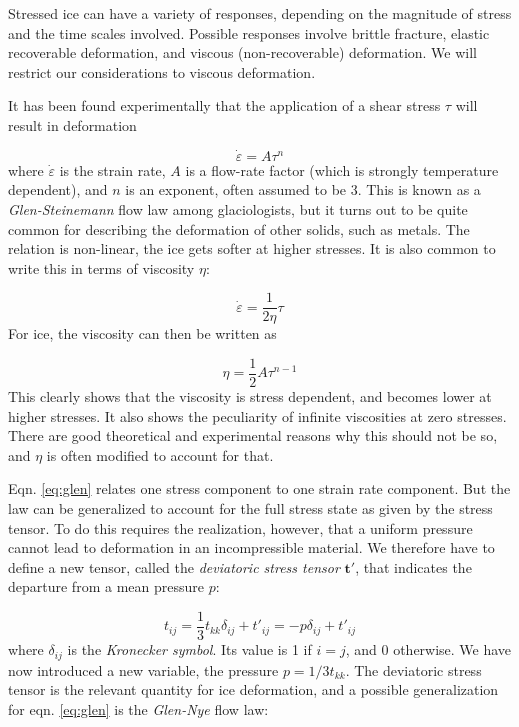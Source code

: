 \documentclass[12pt, openany]{memoir}
\newcommand{\eps}{\dot{\varepsilon}}
\begin{document}
Stressed ice can have a variety of responses, depending on the
magnitude of stress and the time scales involved. Possible responses
involve brittle fracture, elastic recoverable deformation, and viscous
(non-recoverable) deformation. We will restrict our considerations to
viscous deformation.

It has been found experimentally that the application of a shear
stress $\tau$ will result in deformation

\begin{equation} \label{eq:glen}
\eps = A\tau^n
\end{equation}
where $\eps$ is the strain rate, $A$ is a flow-rate factor (which is
strongly temperature dependent), and $n$ is an exponent, often assumed
to be 3. This is known as a \emph{Glen-Steinemann} flow law among
glaciologists, but it turns out to be quite common for describing the
deformation of other solids, such as metals. The relation is non-linear, the ice gets
softer at higher stresses. It is also common to write this in terms of
viscosity $\eta$:

\begin{equation}
\eps = \frac{1}{2\eta}\tau
\end{equation}
For ice, the viscosity can then be written as

\begin{equation}
\eta = \frac{1}{2} A \tau^{n-1}
\end{equation}
This clearly shows that the viscosity is stress dependent, and becomes
lower at higher stresses. It also shows the peculiarity of infinite
viscosities at zero stresses. There are good theoretical and
experimental reasons why this should not be so, and $\eta$ is often
modified to account for that.

Eqn. \ref{eq:glen} relates one stress component to one strain rate
component. But the law can be generalized to account for the full
stress state as given by the stress tensor. To do this requires the
realization, however, that a uniform pressure cannot lead to
deformation in an incompressible material. We therefore have to define
a new tensor, called the \emph{deviatoric stress tensor}
$\mathbf{t}'$, that indicates the departure from a mean pressure $p$:

\begin{equation}
t_{ij} = \frac{1}{3} t_{kk}\delta_{ij} + t'_{ij} = -p \delta_{ij} +
t'_{ij}
\end{equation}
where $\delta_{ij}$ is the \emph{Kronecker symbol}. Its value is 1 if
$i=j$, and 0 otherwise. We have now introduced a new variable, the
pressure $p = 1/3 t_{kk}$. The deviatoric stress tensor is the
relevant quantity for ice deformation, and a possible generalization
for eqn. \ref{eq:glen} is the \emph{Glen-Nye} flow law:
\end{document}
